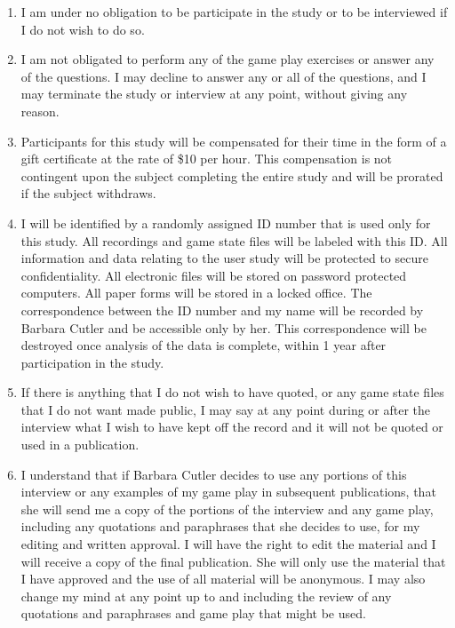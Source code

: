 \documentclass[10pt]{article}
\begin{document}
\begin{enumerate}


\vspace{-0.04in}
\item I am under no obligation to be participate in the study or to be
  interviewed if I do not wish to do so.  

\vspace{-0.04in}
\item I am not obligated to perform any of the game play exercises or
  answer any of the questions.  I may decline to answer any or all of
  the questions, and I may terminate the study or interview at
  any point, without giving any reason.

\vspace{-0.04in}
\item 
Participants for this study will be compensated for their time in the
form of a gift certificate at the rate of \$10 per hour.  This
compensation is not contingent upon the subject completing the entire
study and will be prorated if the subject withdraws.

\vspace{-0.04in}
\item I will be identified by a randomly assigned ID number that is
  used only for this study.  All recordings and game state files will be
  labeled with this ID.  All information and data relating to the user
  study will be protected to secure confidentiality.  All electronic
  files will be stored on password protected computers.  All paper
  forms will be stored in a locked office.  The correspondence
  between the ID number and my name will be recorded by Barbara Cutler
  and be accessible only by her.  This correspondence will be
  destroyed once analysis of the data is complete, within 1 year after
  participation in the study.

\vspace{-0.04in}
\item If there is anything that I do not wish to have quoted, or any
  game state files that I do not want made public, I may say at any point
  during or after the interview what I wish to have kept off the
  record and it will not be quoted or used in a publication.

\vspace{-0.04in}
\item I understand that if Barbara Cutler decides to use any portions
  of this interview or any examples of my game play in subsequent
  publications, that she will send me a copy of the portions of the
  interview and any game play, including any quotations and paraphrases
  that she decides to use, for my editing and written approval.  I
  will have the right to edit the material and I will receive a copy
  of the final publication.  She will only use the material that I
  have approved and the use of all material will be anonymous.
  I may also change my mind at any point up to and
  including the review of any quotations and paraphrases and game play
  that might be used.
\vspace{-0.05in}


\end{enumerate}
\end{document}
